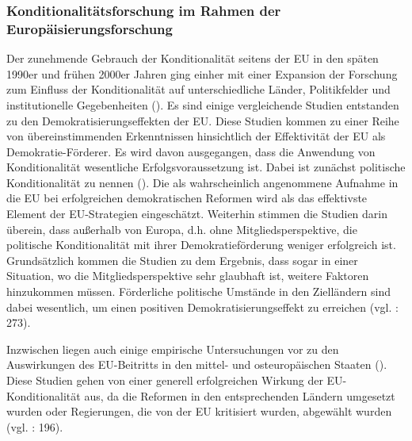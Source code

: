 \subsubsection{Konditionalitätsforschung im Rahmen der Europäisierungsforschung }
Der zunehmende Gebrauch der Konditionalität seitens der EU in den späten 1990er und frühen 2000er Jahren ging einher mit einer Expansion der Forschung zum Einfluss der Konditionalität auf unterschiedliche Länder, Politikfelder und institutionelle Gegebenheiten (\cite{grab99, grab01, grab03, schsed04, schsed05b, schsed05c, vachudova01, vachudova05}). Es sind einige vergleichende Studien entstanden zu den Demokratisierungseffekten der EU. Diese Studien kommen zu einer Reihe von übereinstimmenden Erkenntnissen hinsichtlich der Effektivität der EU als Demokratie-Förderer. Es wird davon ausgegangen, dass die Anwendung von Konditionalität wesentliche Erfolgsvoraussetzung ist. Dabei ist zunächst politische Konditionalität zu nennen (\cite{kelley, kubicek, pridham05, schetal, vachudova05, youngs}). Die als wahrscheinlich angenommene Aufnahme in die EU bei erfolgreichen demokratischen Reformen wird als das effektivste Element der EU-Strategien eingeschätzt. Weiterhin stimmen die Studien darin überein, dass außerhalb von Europa, d.h. ohne Mitgliedsperspektive, die politische Konditionalität mit ihrer Demokratieförderung weniger erfolgreich ist. Grundsätzlich kommen die Studien zu dem Ergebnis, dass sogar in einer Situation, wo die Mitgliedsperspektive sehr glaubhaft ist, weitere Faktoren hinzukommen müssen. Förderliche politische Umstände in den Zielländern sind dabei wesentlich, um einen positiven Demokratisierungseffekt zu erreichen (vgl. \cite{schsch07} : 273).\par
Inzwischen liegen auch einige empirische Untersuchungen vor zu den Auswirkungen des EU-Beitritts in den mittel- und osteuropäischen Staaten (\cite{dimit02, grab05, kneuer07, linden, schsed05a}). Diese Studien gehen von einer generell erfolgreichen Wirkung der EU-Konditionalität aus, da die Reformen in den entsprechenden Ländern umgesetzt wurden oder Regierungen, die von der EU kritisiert wurden, abgewählt wurden (vgl. \cite{brusis09} : 196).\par

